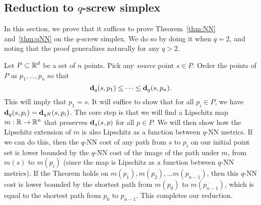 \subsection{Reduction to $q$-screw simplex} %
\label{sec:reduction-to-screw}
In this section, we prove that it suffices to prove Theorem~\ref{thm:NN}
and~\ref{thm:qNN} on the $q$-screw simplex. We do so by doing it when
$q=2$, and noting that the proof generalizes naturally for any $q > 2$.

  Let $P\subset \mathbb{R}^d$ be a set of $n$ points.
  Pick any \emph{source} point $s\in P$.
  Order the points of $P$ as $p_1,\ldots ,p_n$ so that
  \[
    \mathbf{d}_q(s,p_1) \le \cdots \le \mathbf{d}_q(s, p_n).
  \]
  This will imply that $p_1 = s$.
  It will suffice to show that for all $p_i\in P$, we have $\mathbf{d}_q(s,p_i)
= \mathbf{d}_{qN}(s,p_i)$.
The core step is that we will find a Lipschitz map $m: \mathbb{R} \rightarrow \mathbb{R}^n$
that preserves $\mathbf{d}_q(s,p)$ for all $p \in P$. We will then show how the
Lipschitz extension of $m$ is also Lipschitz as a function between $q$-NN
metrics. If we can do this, then the $q$-NN cost of any path from $s$ to
$p_i$ on our initial point set is lower bounded by the $q$-NN cost of the
image of the path under $m$, from $m(s)$ to $m(p_i)$ (since the map is Lipschitz as a function
between $q$-NN metrics). If the Theorem holds on $m(p_1), m(p_2), \ldots
m(p_{n-1})$, then this $q$-NN cost is lower bounded by the shortest path
from $m(p_0)$ to $m(p_{n-1})$, which is equal to the shortest path from
$p_0$ to $p_{n-1}$. This completes our reduction.
  
  
  
  

